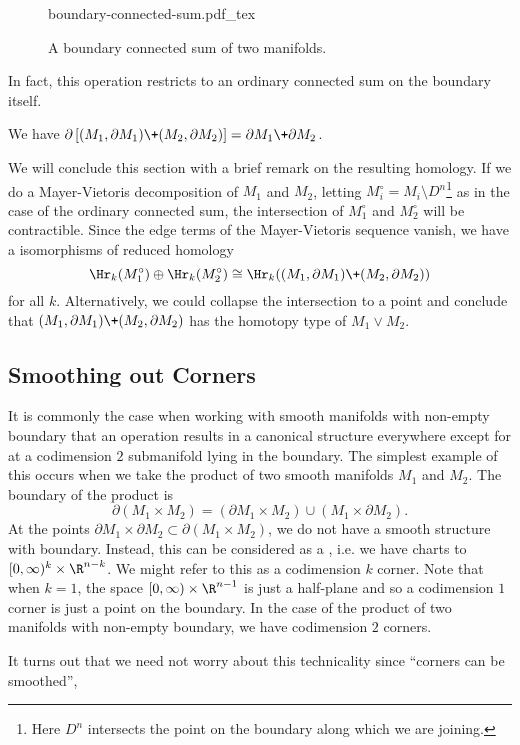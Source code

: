 \begin{figure}[ht]
	\centering
	{boundary-connected-sum.pdf_tex}
	\caption{A boundary connected sum of two manifolds.}\label{fig:boundary-connected-sum}
\end{figure}

In fact, this operation restricts to an ordinary connected sum on the boundary itself.

\begin{proposition} We have $\partial\left[(M_1,\partial M_1)\+ (M_2,\partial M_2)\right] = \partial M_1\+\partial M_2$.
\end{proposition}

We will conclude this section with a brief remark on the resulting homology. If we do a Mayer-Vietoris decomposition of $M_1$ and $M_2$, letting $M_i^\circ=M_i\setminus D^n$\footnote{Here $D^n$ intersects the point on the boundary along which we are joining.} as in the case of the ordinary connected sum, the intersection of $M_1^\circ$ and $M_2^\circ$ will be contractible. Since the edge terms of the Mayer-Vietoris sequence vanish, we have a isomorphisms of reduced homology
\[
		\Hr_k(M_1^\circ)\oplus \Hr_k(M_2^\circ) \cong \Hr_k((M_1,\partial M_1)\+ (M_2,\partial M_2))
\]
for all $k$. Alternatively, we could collapse the intersection to a point and conclude that $(M_1,\partial M_1)\+(M_2,\partial M_2)$ has the homotopy type of $M_1\vee M_2$.

\subsection{Smoothing out Corners}\label{sec:smoothing-corners}

It is commonly the case when working with smooth manifolds with non-empty boundary that an operation results in a canonical structure everywhere except for at a codimension $2$ submanifold lying in the boundary. The simplest example of this occurs when we take the product of two smooth manifolds $M_1$ and $M_2$. The boundary of the product is
\[
		\partial(M_1\times M_2) = (\partial M_1 \times M_2) \cup (M_1\times \partial M_2).
\]
At the points $\partial M_1\times \partial M_2\subset \partial (M_1\times M_2)$, we do not have a smooth structure with boundary. Instead, this can be considered as a , i.e. we have charts to $[0,\infty)^k\times \R^{n-k}$. We might refer to this as a codimension $k$ corner. Note that when $k=1$, the space $[0,\infty)\times \R^{n-1}$ is just a half-plane and so a codimension $1$ corner is just a point on the boundary. In the case of the product of two manifolds with non-empty boundary, we have codimension $2$ corners. 

It turns out that we need not worry about this technicality since ``corners can be smoothed'', 

\cite{milnor1958manifolds}
